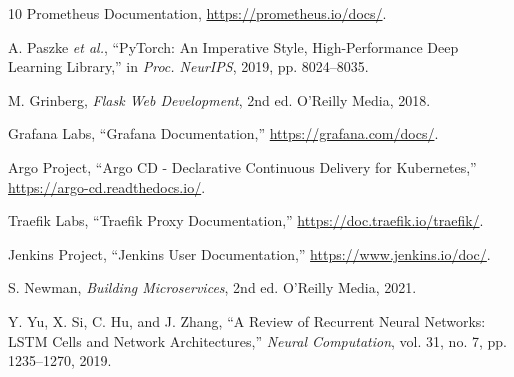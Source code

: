 \documentclass[journal]{IEEEtran}
\begin{document}
\begin{thebibliography}{10}
Prometheus Documentation, \url{https://prometheus.io/docs/}.

A. Paszke \textit{et al.}, ``PyTorch: An Imperative Style, High-Performance Deep Learning Library,'' in \textit{Proc. NeurIPS}, 2019, pp. 8024--8035.

M. Grinberg, \textit{Flask Web Development}, 2nd ed. O'Reilly Media, 2018.

Grafana Labs, ``Grafana Documentation,'' \url{https://grafana.com/docs/}.

Argo Project, ``Argo CD - Declarative Continuous Delivery for Kubernetes,'' \url{https://argo-cd.readthedocs.io/}.

Traefik Labs, ``Traefik Proxy Documentation,'' \url{https://doc.traefik.io/traefik/}.

Jenkins Project, ``Jenkins User Documentation,'' \url{https://www.jenkins.io/doc/}.

S. Newman, \textit{Building Microservices}, 2nd ed. O'Reilly Media, 2021.

Y. Yu, X. Si, C. Hu, and J. Zhang, ``A Review of Recurrent Neural Networks: LSTM Cells and Network Architectures,'' \textit{Neural Computation}, vol. 31, no. 7, pp. 1235--1270, 2019.

\end{thebibliography}
\end{document}
